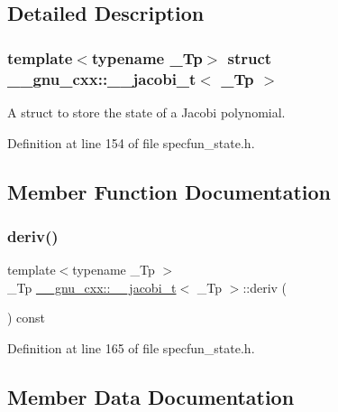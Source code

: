 \subsection{Detailed Description}
\subsubsection*{template$<$typename \+\_\+\+Tp$>$\newline
struct \+\_\+\+\_\+gnu\+\_\+cxx\+::\+\_\+\+\_\+jacobi\+\_\+t$<$ \+\_\+\+Tp $>$}

A struct to store the state of a Jacobi polynomial. 

Definition at line 154 of file specfun\+\_\+state.\+h.



\subsection{Member Function Documentation}
\mbox{\label{struct____gnu__cxx_1_1____jacobi__t_a2b1a1fc42308cb293dfcb1fa4a8202a6}} 
\subsubsection{\texorpdfstring{deriv()}{deriv()}}
{\footnotesize\ttfamily template$<$typename \+\_\+\+Tp $>$ \\
\+\_\+\+Tp \hyperlink{struct____gnu__cxx_1_1____jacobi__t}{\+\_\+\+\_\+gnu\+\_\+cxx\+::\+\_\+\+\_\+jacobi\+\_\+t}$<$ \+\_\+\+Tp $>$\+::deriv (\begin{DoxyParamCaption}{ }\end{DoxyParamCaption}) const\hspace{0.3cm}{\ttfamily [inline]}}



Definition at line 165 of file specfun\+\_\+state.\+h.



\subsection{Member Data Documentation}
\mbox{\label{struct____gnu__cxx_1_1____jacobi__t_ab81da2815aa171345bf3893855b8c9a6}} 
